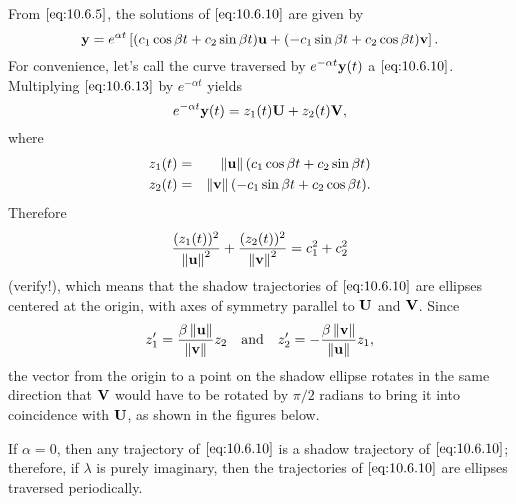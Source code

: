 \documentclass{ximera}
\begin{document}
From $\eqref{eq:10.6.5}$, the solutions of $\eqref{eq:10.6.10}$ are given by
\begin{equation} \label{eq:10.6.13} {\bf y}=e^{\alpha t}\left[(c_1\cos\beta
t+c_2\sin\beta t){\bf u} +(-c_1\sin\beta t+c_2\cos\beta t){\bf
v}\right]. 
\end{equation} 
For convenience, let's call the curve
traversed by $e^{-\alpha t}{\bf y}(t)$ a 
$\eqref{eq:10.6.10}$. Multiplying $\eqref{eq:10.6.13}$ by $e^{-\alpha t}$ yields
$$
e^{-\alpha t}{\bf y}(t)=z_1(t){\bf U}+z_2(t){\bf V},
$$
where
\begin{eqnarray*}
z_1(t)&=&\left\lVert{\bf u}\right\rVert(c_1\cos\beta t+c_2\sin\beta
t)\\ z_2(t)&=&\left\lVert{\bf v}\right\rVert(-c_1\sin\beta t+c_2\cos\beta t).
\end{eqnarray*}
Therefore
$$ \frac{(z_1(t))^2}{\left\lVert{\bf
u}\right\rVert^2}+\frac{(z_2(t))^2}{\left\lVert{\bf v}\right\rVert^2} =c_1^2+c_2^2
$$
(verify!), which means that the shadow trajectories of $\eqref{eq:10.6.10}$
are ellipses centered at the origin, with axes of symmetry parallel to
${\bf U}$ and ${\bf V}$. Since
$$
z_1'=\frac{\beta\left\lVert{\bf u}\right\rVert}{\left\lVert{\bf v}\right\rVert} z_2\quad\mbox{and}\quad
z_2'=-\frac{\beta\left\lVert{\bf v}\right\rVert}{\left\lVert{\bf u}\right\rVert} z_1,
$$
 the vector from the
origin to a point on the shadow ellipse rotates in the same direction
that ${\bf V}$ would have to be rotated by $\pi/2$ radians to bring it
into coincidence with ${\bf U}$, as shown in the figures below.

\begin{center}
\end{center}

\begin{center}
\end{center}




If $\alpha=0$, then any trajectory of $\eqref{eq:10.6.10}$ is a shadow
trajectory of $\eqref{eq:10.6.10}$;  therefore, if $\lambda$ is purely
imaginary, then the trajectories of $\eqref{eq:10.6.10}$ are ellipses
traversed
periodically. 
\end{document}
